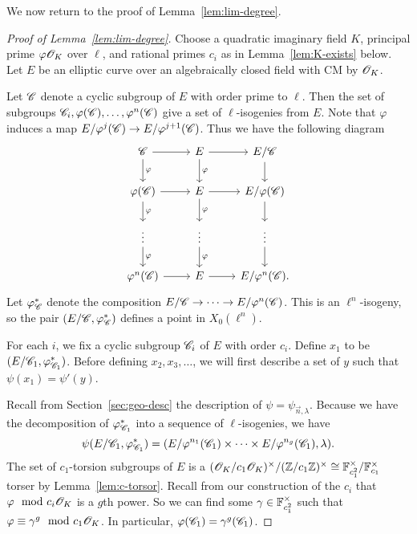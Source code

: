 \documentclass{amsart}
\begin{document}
We now return to the proof of Lemma~\ref{lem:lim-degree}.

\begin{proof}[Proof of Lemma~\ref{lem:lim-degree}]
  Choose a quadratic imaginary field $K$, principal prime $\varphi\mathscr{O}_K$ over $\ell$, and rational primes $c_i$ as in Lemma~\ref{lem:K-exists} below. Let $E$ be an elliptic curve over an algebraically closed field with CM by $\mathscr{O}_K$.

  Let $\mathscr{C}$ denote a cyclic subgroup of $E$ with order prime to $\ell$. Then the set of subgroups $\mathscr{C}_i, \varphi(\mathscr{C}), \dots, \varphi^n(\mathscr{C})$ give a set of $\ell$-isogenies from $E$. Note that $\varphi$ induces a map $E/\varphi^j(\mathscr{C}) \to E/\varphi^{j+1}(\mathscr{C})$. Thus we have the following diagram
  \[
    \begin{tikzcd}
      \sC \arrow[d,"\varphi"] \arrow[r] & E \arrow[d,"\varphi"] \arrow[r] & E/\sC \arrow[d]
      \\
      \varphi(\sC) \arrow[d,"\varphi"] \arrow[r] & E \arrow[d,"\varphi"] \arrow[r] & E/\varphi(\sC) \arrow[d]
      \\
      \vdots \arrow[d,"\varphi"] & \vdots \arrow[d,"\varphi"] & \vdots \arrow[d]
      \\
      \varphi^n(\sC) \arrow[r] & E \arrow[r] & E/\varphi^{n}(\sC).
    \end{tikzcd}
  \]
  Let $\varphi^{\ast}_{\mathscr{C}}$ denote the composition $E/\mathscr{C} \to \cdots \to E/\varphi^n(\mathscr{C})$. This is an $\ell^n$-isogeny, so the pair $(E/\mathscr{C},\varphi^{\ast}_{\mathscr{C}})$ defines a point in $X_0(\ell^n)$.

  For each $i$, we fix a cyclic subgroup $\mathscr{C}_i$ of $E$ with order $c_i$. Define $x_1$ to be $(E/\mathscr{C}_1,\varphi^{\ast}_{\mathscr{C}_1})$. Before defining $x_2,x_3,\dots$, we will first describe a set of $y$ such that $\psi(x_1) = \psi'(y)$.

  Recall from Section~\ref{sec:geo-desc} the description of $\psi = \psi_{\vec{n},\lambda}$. Because we have the decomposition of $\varphi^{\ast}_{\mathscr{C}_1}$ into a sequence of $\ell$-isogenies, we have
  \[
    \psi(E/\mathscr{C}_1,\varphi^{\ast}_{\mathscr{C}_1}) = (E/\varphi^{n_1}(\mathscr{C}_1) \times \cdots \times E/\varphi^{n_g}(\mathscr{C}_1),\lambda).
  \]
  The set of $c_1$-torsion subgroups of $E$ is a $(\mathscr{O}_K/c_1\mathscr{O}_K)^\times/(\mathbb{Z}/c_1\mathbb{Z})^\times \cong \mathbb{F}_{c_1^2}^\times/\mathbb{F}_{c_1}^\times$ torser by Lemma~\ref{lem:c-torsor}. Recall from our construction of the $c_i$ that $\varphi \mod{c_i\mathscr{O}_K}$ is a $g$th power. So we can find some $\gamma \in \mathbb{F}_{c_1^2}^\times$ such that $\varphi \equiv \gamma^g \mod{c_1\mathscr{O}_K}$. In particular, $\varphi(\mathscr{C}_1) = \gamma^g(\mathscr{C}_1)$.


\end{proof}
\end{document}
